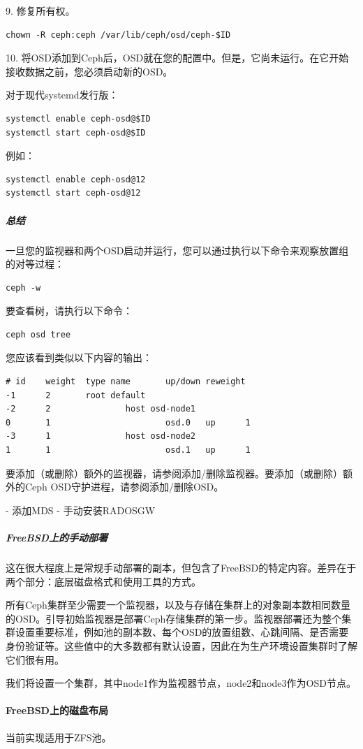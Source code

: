 \documentclass[12pt,UTF8]{ctexbook}
\begin{document}
9. 修复所有权。
\begin{verbatim}
chown -R ceph:ceph /var/lib/ceph/osd/ceph-$ID
\end{verbatim}

10. 将OSD添加到Ceph后，OSD就在您的配置中。但是，它尚未运行。在它开始接收数据之前，您必须启动新的OSD。

对于现代systemd发行版：
\begin{verbatim}
systemctl enable ceph-osd@$ID
systemctl start ceph-osd@$ID
\end{verbatim}

例如：
\begin{verbatim}
systemctl enable ceph-osd@12
systemctl start ceph-osd@12
\end{verbatim}

\subparagraph{总结}
一旦您的监视器和两个OSD启动并运行，您可以通过执行以下命令来观察放置组的对等过程：
\begin{verbatim}
ceph -w
\end{verbatim}

要查看树，请执行以下命令：
\begin{verbatim}
ceph osd tree
\end{verbatim}

您应该看到类似以下内容的输出：
\begin{verbatim}
# id    weight  type name       up/down reweight
-1      2       root default
-2      2               host osd-node1
0       1                       osd.0   up      1
-3      1               host osd-node2
1       1                       osd.1   up      1
\end{verbatim}

要添加（或删除）额外的监视器，请参阅添加/删除监视器。要添加（或删除）额外的Ceph OSD守护进程，请参阅添加/删除OSD。

- 添加MDS
- 手动安装RADOSGW
\subparagraph{FreeBSD上的手动部署}
这在很大程度上是常规手动部署的副本，但包含了FreeBSD的特定内容。差异在于两个部分：底层磁盘格式和使用工具的方式。

所有Ceph集群至少需要一个监视器，以及与存储在集群上的对象副本数相同数量的OSD。引导初始监视器是部署Ceph存储集群的第一步。监视器部署还为整个集群设置重要标准，例如池的副本数、每个OSD的放置组数、心跳间隔、是否需要身份验证等。这些值中的大多数都有默认设置，因此在为生产环境设置集群时了解它们很有用。

我们将设置一个集群，其中node1作为监视器节点，node2和node3作为OSD节点。

\paragraph{FreeBSD上的磁盘布局}
当前实现适用于ZFS池。
\end{document}
